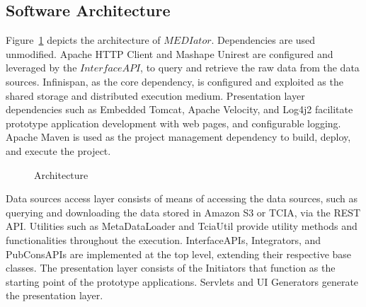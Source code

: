 \documentclass[conference]{IEEEtran}
\begin{document}
\subsection{Software Architecture}
Figure~\ref{fig:arch} depicts the architecture of $MEDIator$. Dependencies are used unmodified. Apache HTTP Client and Mashape Unirest are configured and leveraged by the $InterfaceAPI$, to query and retrieve the raw data from the data sources. Infinispan, as the core dependency, is configured and exploited as the shared storage and distributed execution medium. Presentation layer dependencies such as Embedded Tomcat, Apache Velocity, and Log4j2 facilitate prototype application development with web pages, and configurable logging. Apache Maven is used as the project management dependency to build, deploy, and execute the project.
\begin{figure}[!htbp]
\begin{center}
\end{center}
  \vspace{-18pt}
  
 \caption{Architecture}
 \label{fig:arch}
 \vspace{-13pt}
 
\end{figure}


Data sources access layer consists of means of accessing the data sources, such as querying and downloading the data stored in Amazon S3 or TCIA, via the REST API. Utilities such as MetaDataLoader and TciaUtil provide utility methods and functionalities throughout the execution. InterfaceAPIs, Integrators, and PubConsAPIs are implemented at the top level, extending their respective base classes. The presentation layer consists of the Initiators that function as the starting point of the prototype applications. Servlets and UI Generators generate the presentation layer. 
\end{document}
